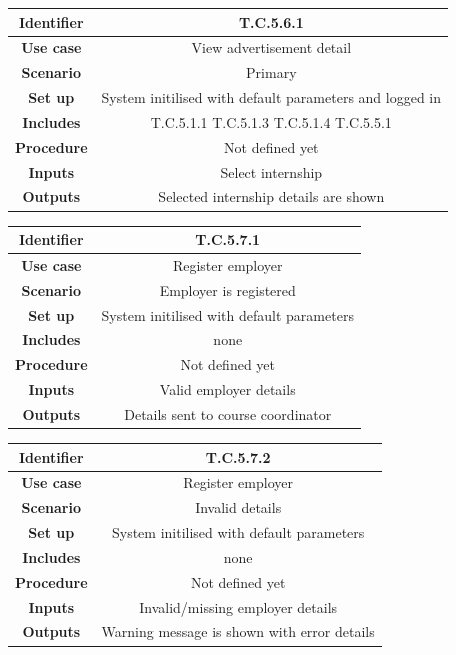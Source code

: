 \documentclass{l3deliverable}
\begin{document}
\begin{tabular}{|c|c|}
\hline \textbf{Identifier} & T.C.5.6.1\\
\hline \textbf{Use case} & View advertisement detail\\
\hline \textbf{Scenario} & Primary\\
\hline \textbf{Set up} & System initilised with default parameters and logged in\\
\hline \textbf{Includes} & T.C.5.1.1 T.C.5.1.3 T.C.5.1.4 T.C.5.5.1\\
\hline \textbf{Procedure} & Not defined yet\\
\hline \textbf{Inputs} & Select internship\\
\hline \textbf{Outputs} & Selected internship details are shown\\
\hline
\end{tabular}

\begin{tabular}{|c|c|}
\hline \textbf{Identifier} & T.C.5.7.1\\
\hline \textbf{Use case} & Register employer\\
\hline \textbf{Scenario} & Employer is registered\\
\hline \textbf{Set up} & System initilised with default parameters\\
\hline \textbf{Includes} & none\\
\hline \textbf{Procedure} & Not defined yet\\
\hline \textbf{Inputs} & Valid employer details\\
\hline \textbf{Outputs} & Details sent to course coordinator\\
\hline
\end{tabular}

\begin{tabular}{|c|c|}
\hline \textbf{Identifier} & T.C.5.7.2\\
\hline \textbf{Use case} & Register employer\\
\hline \textbf{Scenario} & Invalid details\\
\hline \textbf{Set up} & System initilised with default parameters\\
\hline \textbf{Includes} & none\\
\hline \textbf{Procedure} & Not defined yet\\
\hline \textbf{Inputs} & Invalid/missing employer details\\
\hline \textbf{Outputs} & Warning message is shown with error details\\
\hline
\end{tabular}
\end{document}

